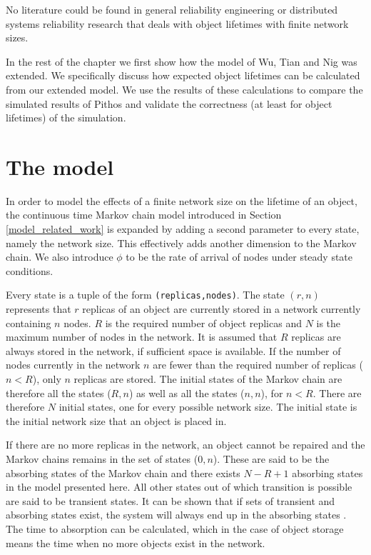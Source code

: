 No literature could be found in general reliability engineering or distributed systems reliability research that deals with object lifetimes with finite network sizes.

In the rest of the chapter we first show how the model of Wu, Tian and Nig was extended. We specifically discuss how expected object lifetimes can be calculated from our extended model. We use the results of these calculations to compare the simulated results of Pithos and validate the correctness (at least for object lifetimes) of the simulation.

\section{The model}
\label{model}

In order to model the effects of a finite network size on the lifetime of an object, the continuous time Markov chain model introduced in Section \ref{model_related_work} is expanded by adding a second parameter to every state, namely the network size. This effectively adds another dimension to the Markov chain. We also introduce $\phi$ to be the rate of arrival of nodes under steady state conditions.

Every state is a tuple of the form \verb.(replicas,nodes).. The state $(r, n)$ represents that $r$ replicas of an object are currently stored in a network currently containing $n$ nodes. $R$ is the required number of object replicas and $N$ is the maximum number of nodes in the network. It is assumed that $R$ replicas are always stored in the network, if sufficient space is available. If the number of nodes currently in the network $n$ are fewer than the required number of replicas ($n < R$), only $n$ replicas are stored. The initial states of the Markov chain are therefore all the states ($R,n$) as well as all the states ($n,n$), for $n < R$. There are therefore $N$ initial states, one for every possible network size. The initial state is the initial network size that an object is placed in.

If there are no more replicas in the network, an object cannot be repaired and the Markov chains remains in the set of states ($0,n$). These are said to be the absorbing states of the Markov chain and there exists $N - R + 1$ absorbing states in the model presented here. All other states out of which transition is possible are said to be transient states. It can be shown that if sets of transient and absorbing states exist, the system will always end up in the absorbing states \cite{grinstead1997introduction_probability}. The time to absorption can be calculated, which in the case of object storage means the time when no more objects exist in the network.

